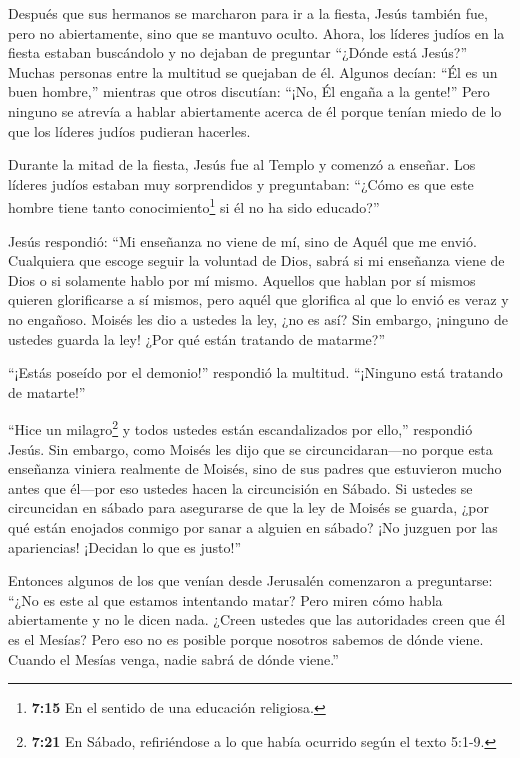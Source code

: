  Después que sus hermanos se marcharon para ir a la fiesta,
Jesús también fue, pero no abiertamente, sino que se mantuvo oculto.
 Ahora, los líderes judíos en la fiesta estaban buscándolo
y no dejaban de preguntar ``¿Dónde está Jesús?''  Muchas
personas entre la multitud se quejaban de él. Algunos decían: ``Él es un
buen hombre,'' mientras que otros discutían: ``¡No, Él engaña a la
gente!''  Pero ninguno se atrevía a hablar abiertamente
acerca de él porque tenían miedo de lo que los líderes judíos pudieran
hacerles.

 Durante la mitad de la fiesta, Jesús fue al Templo y
comenzó a enseñar.  Los líderes judíos estaban muy
sorprendidos y preguntaban: ``¿Cómo es que este hombre tiene tanto
conocimiento\footnote{\textbf{7:15} En el sentido de una educación
  religiosa.} si él no ha sido educado?''

 Jesús respondió: ``Mi enseñanza no viene de mí, sino de
Aquél que me envió.  Cualquiera que escoge seguir la
voluntad de Dios, sabrá si mi enseñanza viene de Dios o si solamente
hablo por mí mismo.  Aquellos que hablan por sí mismos
quieren glorificarse a sí mismos, pero aquél que glorifica al que lo
envió es veraz y no engañoso.  Moisés les dio a ustedes la
ley, ¿no es así? Sin embargo, ¡ninguno de ustedes guarda la ley! ¿Por
qué están tratando de matarme?''

 ``¡Estás poseído por el demonio!'' respondió la multitud.
``¡Ninguno está tratando de matarte!''

 ``Hice un milagro\footnote{\textbf{7:21} En Sábado,
  refiriéndose a lo que había ocurrido según el texto 5:1-9.} y todos
ustedes están escandalizados por ello,'' respondió Jesús. 
Sin embargo, como Moisés les dijo que se circuncidaran---no porque esta
enseñanza viniera realmente de Moisés, sino de sus padres que estuvieron
mucho antes que él---por eso ustedes hacen la circuncisión en Sábado.
 Si ustedes se circuncidan en sábado para asegurarse de que
la ley de Moisés se guarda, ¿por qué están enojados conmigo por sanar a
alguien en sábado?  ¡No juzguen por las apariencias!
¡Decidan lo que es justo!''

 Entonces algunos de los que venían desde Jerusalén
comenzaron a preguntarse: ``¿No es este al que estamos intentando matar?
 Pero miren cómo habla abiertamente y no le dicen nada.
¿Creen ustedes que las autoridades creen que él es el Mesías?
 Pero eso no es posible porque nosotros sabemos de dónde
viene. Cuando el Mesías venga, nadie sabrá de dónde viene.''


